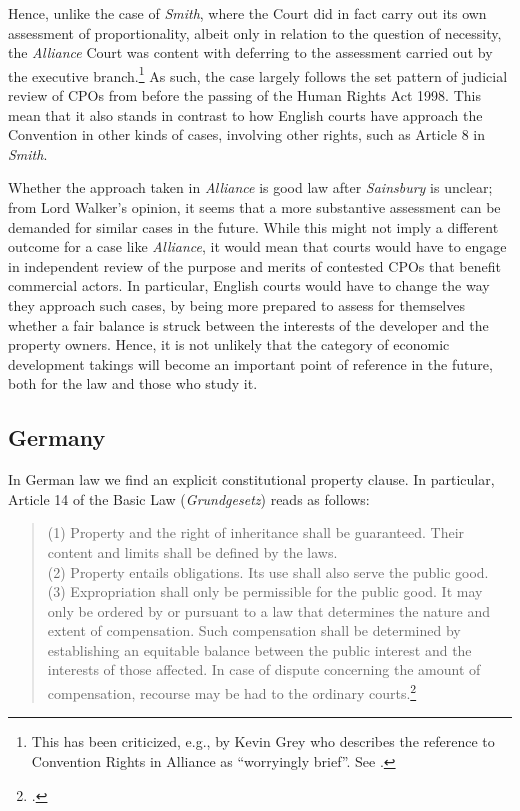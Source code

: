 \documentclass[12pt,a4paper]{book} %
\begin{document}
Hence, unlike the case of {\it Smith}, where the Court did in fact carry out its own assessment of proportionality, albeit only in relation to the question of necessity, the {\it Alliance} Court was content with deferring to the assessment carried out by the executive branch.\footnote{This has been criticized, e.g., by Kevin Grey who describes the reference to Convention Rights in Alliance as ``worryingly brief''. See \cite{gray11}.} As such, the case largely follows the set pattern of judicial review of CPOs from before the passing of the Human Rights Act 1998. This mean that it also stands in contrast to how English courts have approach the Convention in other kinds of cases, involving other rights, such as Article 8 in {\it Smith}. 

Whether the approach taken in {\it Alliance} is good law after {\it Sainsbury} is unclear; from Lord Walker's opinion, it seems that a more substantive assessment can be demanded for similar cases in the future. While this might not imply a different outcome for a case like {\it Alliance}, it would mean that courts would have to engage in independent review of the purpose and merits of contested CPOs that benefit commercial actors. In particular, English courts would have to change the way they approach such cases, by being more prepared to assess for themselves whether a fair balance is struck between the interests of the developer and the property owners. Hence, it is not unlikely that the category of economic development takings will become an important point of reference in the future, both for the law and those who study it.

\subsection{Germany}\label{sec:germany}

In German law we find an explicit constitutional property clause. In particular, Article 14 of the Basic Law ({\it Grundgesetz}) reads as follows:

\begin{quote}
(1) Property and the right of inheritance shall be guaranteed. Their content and limits shall be defined by the laws. \\
(2) Property entails obligations. Its use shall also serve the public good. \\
(3) Expropriation shall only be permissible for the public good. It may only be ordered by or pursuant to a law that determines the nature and extent of compensation. Such compensation shall be determined by establishing an equitable balance between the public interest and the interests of those affected. In case of dispute concerning the amount of compensation, recourse may be had to the ordinary courts.\footcite[14]{basic49}
\end{quote}
\end{document}

